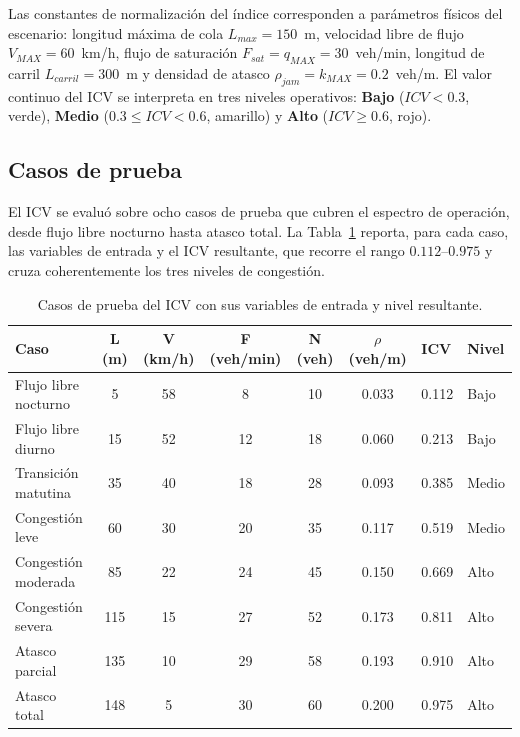 Las constantes de normalización del índice corresponden a parámetros físicos del escenario:
longitud máxima de cola $L_{max}=150$~m, velocidad libre de flujo $V_{MAX}=60$~km/h, flujo de
saturación $F_{sat}=q_{MAX}=30$~veh/min, longitud de carril $L_{carril}=300$~m y densidad de
atasco $\rho_{jam}=k_{MAX}=0.2$~veh/m. El valor continuo del ICV se interpreta en tres niveles
operativos: \textbf{Bajo} ($ICV<0.3$, verde), \textbf{Medio} ($0.3\leq ICV<0.6$, amarillo) y
\textbf{Alto} ($ICV\geq 0.6$, rojo).

\subsection{Casos de prueba}\label{subsec:icv-casos}

El ICV se evaluó sobre ocho casos de prueba que cubren el espectro de operación, desde flujo
libre nocturno hasta atasco total. La Tabla~\ref{tab:casos-icv} reporta, para cada caso, las
variables de entrada y el ICV resultante, que recorre el rango $0.112$--$0.975$ y cruza
coherentemente los tres niveles de congestión.

\begin{table}[H]
  \centering
  \footnotesize
  \caption{Casos de prueba del ICV con sus variables de entrada y nivel resultante.}
  \label{tab:casos-icv}
  \begin{tabular}{@{}lcccccll@{}}
    \toprule
    \textbf{Caso} & \textbf{L (m)} & \textbf{V (km/h)} & \textbf{F (veh/min)} &
    \textbf{N (veh)} & \textbf{$\rho$ (veh/m)} & \textbf{ICV} & \textbf{Nivel} \\
    \midrule
    Flujo libre nocturno   & 5   & 58 & 8  & 10 & 0.033 & 0.112 & Bajo  \\
    Flujo libre diurno     & 15  & 52 & 12 & 18 & 0.060 & 0.213 & Bajo  \\
    Transición matutina    & 35  & 40 & 18 & 28 & 0.093 & 0.385 & Medio \\
    Congestión leve        & 60  & 30 & 20 & 35 & 0.117 & 0.519 & Medio \\
    Congestión moderada    & 85  & 22 & 24 & 45 & 0.150 & 0.669 & Alto  \\
    Congestión severa      & 115 & 15 & 27 & 52 & 0.173 & 0.811 & Alto  \\
    Atasco parcial         & 135 & 10 & 29 & 58 & 0.193 & 0.910 & Alto  \\
    Atasco total           & 148 & 5  & 30 & 60 & 0.200 & 0.975 & Alto  \\
    \bottomrule
  \end{tabular}
\end{table}

